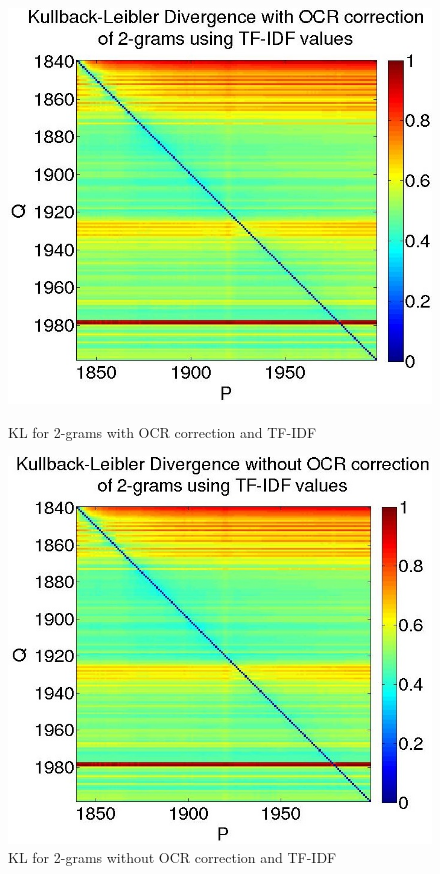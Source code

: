 \begin{figure}[H]
    \begin{minipage}[b]{0.48\linewidth}
        \includegraphics[scale=0.25]{Pictures/kullback-leibler/KL_2-grams_with_correction_tfidf.jpg}
        \caption{KL for 2-grams with OCR correction and TF-IDF}
        \label{KL-TC2}
    \end{minipage}\hfill
    \begin{minipage}[b]{0.5\linewidth}
        \includegraphics[scale=0.25]{Pictures/kullback-leibler/KL_2-grams_without_correction_tfidf.jpg}
        \caption{KL for 2-grams without OCR correction and TF-IDF}
        \label{KL-TN2}
    \end{minipage}\hfill
\end{figure}


